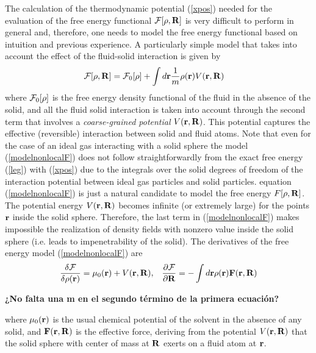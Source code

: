 \documentclass[b5paper,openright,10pt]{book}
\newcommand{\Note}[1]{{\bf \color{red}#1}}    %
\begin{document}
The calculation of the thermodynamic potential (\ref{xpos}) needed for
the evaluation of the free  energy functional ${\cal F}[\rho,{\bf R}]$
is very difficult  to perform in general and,  therefore, one needs to  model the
free energy functional based on intuition and previous experience. A
particularly simple model that takes into account the effect of the
fluid-solid interaction is given by
\begin{align}
  {\cal F}[\rho,{\bf R}]&={\cal F}_0[\rho]
+\int d{\bf r}\frac{1}{m}
\rho({\bf r})V({\bf r},{\bf R})
\label{modelnonlocalF}
\end{align}
where ${\cal F}_0[\rho]$ is the  free energy density functional of the
fluid in the absence of the solid, and all the fluid solid interaction
is  taken  into  account  through  the second  term  that  involves  a
\textit{coarse-grained   potential}   $V({\bf  r},{\bf   R})$.    This
potential  captures  the  effective (reversible)  interaction  between
solid and fluid atoms.  Note  that even for the case of
  an   ideal  gas   interacting  with   a  solid   sphere  the   model
  (\ref{modelnonlocalF})  does not  follow  straightforwardly from  the
  exact free energy (\ref{leg}) with (\ref{xpos}) due to the integrals
  over  the solid  degrees  of freedom  of  the interaction  potential
  between    ideal     gas    particles    and     solid    particles.
  equation (\ref{modelnonlocalF}) is just a natural  candidate to model the free
  energy $F[\rho,{\bf R}]$. The potential energy $V({\bf r},{\bf R})$
becomes infinite (or extremely large)  for the points ${\bf r}$ inside
the solid  sphere. Therefore, the last  term in (\ref{modelnonlocalF})
makes impossible the realization of density fields with nonzero value
inside the solid sphere (i.e.  leads to impenetrability of the solid).
The derivatives of the free energy model (\ref{modelnonlocalF}) are
\begin{align}
    \frac{\delta{\cal F}}{\delta\rho({\bf r})}=\mu_0({\bf r})+V({\bf r},{\bf R}),&&
    \frac{\partial{\cal F}}{\partial{\bf R}}=-\int d{\bf r}\rho({\bf r}){\bf F}({\bf r},{\bf R})
\end{align}

\Note{¿No falta una m en el segundo término de la primera ecuación?}

where $\mu_0({\bf r})$ is the  usual chemical potential of the solvent
in the  absence of any  solid, and ${\bf  F}({\bf r},{\bf R})$  is the
effective force, deriving from the potential $V({\bf r},{\bf R})$ that
the solid sphere  with center of mass  at ${\bf R}$ exerts  on a fluid
atom at ${\bf r}$.
\end{document}
